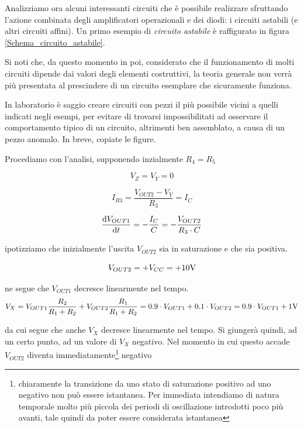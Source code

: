 \documentclass{article}
\begin{document}
Analizziamo ora alcuni interessanti circuiti che è possibile realizzare sfruttando l'azione combinata degli amplificatori operazionali e dei diodi: i circuiti astabili (e altri circuiti affini). Un primo esempio di \textit{circuito astabile} è raffigurato in figura \ref{Schema_circuito_astabile}. 

\vspace{3mm}

Si noti che, da questo momento in poi, considerato che il funzionamento di molti circuiti dipende dai valori degli elementi costruttivi, la teoria generale non verrà più presentata al prescindere di un circuito esemplare che sicuramente funziona. 

\vspace{1mm}

In laboratorio è saggio creare circuiti con pezzi il più possibile vicini a quelli indicati negli esempi, per evitare di trovarsi impossibilitati ad osservare il comportamento tipico di un circuito, altrimenti ben assemblato, a causa di un pezzo anomalo. In breve, copiate le figure.

\vspace{3mm}

Procediamo con l'analisi, supponendo inzialmente $R_4 = R_5$

\[V_Z = V_Y =0\] 

\[I_{R3} = \frac{V_{OUT2} - V_Y}{R_3} = I_C\]

\[\frac{\textrm d V_{OUT1}}{\textrm d t} = -\frac{I_C}{C} = -\frac{V_{OUT2}}{R_3 \cdot C}\]

ipotizziamo che inizialmente l'uscita $V_{OUT2}$ sia in saturazione e che sia positiva.

\[V_{OUT2} = + V_{CC} = + 10 \textrm V\]

ne segue che $V_{OUT1}$ decresce linearmente nel tempo.
\[V_X = V_{OUT1} \frac{R_2}{R_1 + R_2} + V_{OUT2} \frac{R_1}{R_1 + R_2} = 0.9 \cdot V_{OUT1} + 0.1 \cdot V_{OUT2} = 0.9 \cdot V_{OUT1} + 1 \textrm V\]

da cui segue che anche $V_X$ decresce linearmente nel tempo. Si giungerà quindi, ad un certo punto, ad un valore di $V_X$ negativo. Nel momento in cui questo accade $V_{OUT2}$ diventa immediatamente\footnote{chiaramente la transizione da uno stato di saturazione positivo ad uno negativo non può essere istantanea. Per immediata intendiamo di natura temporale molto più piccola dei periodi di oscillazione introdotti poco più avanti, tale quindi da poter essere considerata istantanea} negativo
\end{document}
